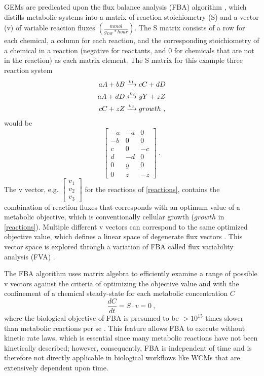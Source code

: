 GEMs are predicated upon the flux balance analysis (FBA) algorithm \cite{Orth2010, Lee2006FluxMetabolomics}, which distills metabolic systems into a matrix of reaction stoichiometry (S) and a vector (v) of variable reaction fluxes $\left( \frac{mmol}{g_{DW}*hour} \right)$. The S matrix consists of a row for each chemical, a column for each reaction, and the corresponding stoichiometry of a chemical in a reaction (negative for reactants, and $0$ for chemicals that are not in the reaction) as each matrix element. The S matrix for this example three reaction system
\begin{equation} \label{reactions}
    \begin{split}
        aA + bB &\xrightarrow{v_1} cC + dD \\
        aA + dD &\xleftrightarrow{v_2} yY + zZ \\ 
        cC + zZ &\xrightarrow{v_3} growth~,
    \end{split}
\end{equation}
would be
\begin{equation} \label{s_matrix}
    \begin{bmatrix}
    -a & -a & 0 \\
    -b & 0 & 0 \\
    c & 0 & -c \\
    d & -d & 0 \\
    0 & y & 0 \\
    0 & z & -z 
    \end{bmatrix}~.
\end{equation}
The v vector, e.g. $\begin{bmatrix} v_1 \\ v_2 \\ v_3\end{bmatrix}$ for the reactions of \cref{reactions}, contains the combination of reaction fluxes that corresponds with an optimum value of a metabolic objective, which is conventionally cellular growth ($growth$ in \cref{reactions}). Multiple different v vectors can correspond to the same optimized objective value, which defines a linear space of degenerate flux vectors \cite{Nagrath2010SoftAnalysis}. This vector space is explored through a variation of FBA called flux variability analysis (FVA)  \cite{Gianchandani2010TheBiology, Gudmundsson2010ComputationallyAnalysis}. 

The FBA algorithm uses matrix algebra  to efficiently examine a range of possible v vectors against the criteria of optimizing the objective value and with the confinement of a chemical steady-state for each metabolic concentration $C$   
\begin{equation} \label{fba_equation}
    \frac{dC}{dt}=S \cdot v=0~,
\end{equation}
where the biological objective of FBA is presumed to be $>10^{15}$ times slower than metabolic reactions per se \cite{Dantus1987Real-timeReactions}. This feature allows FBA to execute without kinetic rate laws, which is essential since many metabolic reactions have not been kinetically described; however, consequently, FBA is independent of time and is therefore not directly applicable in biological workflows like WCMs that are extensively dependent upon time. 

